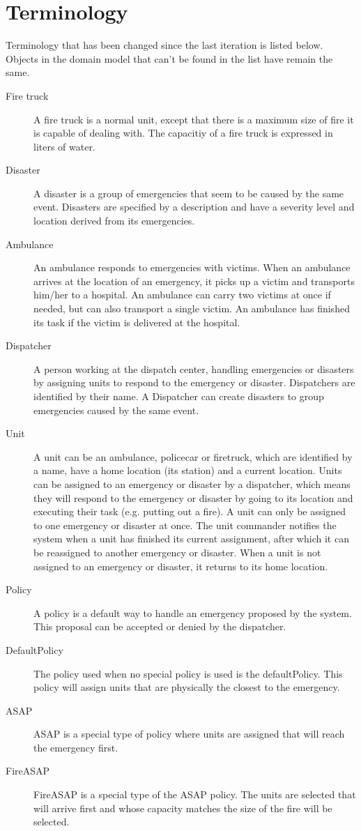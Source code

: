 \section{Terminology}
Terminology that has been changed since the last iteration is listed below. Objects in the domain model that can't be found in the list have remain the same.
\begin{description}
  \item[Fire truck] A fire truck is a normal unit, except that there is a maximum size of fire it is capable of dealing with. The capacitiy of a fire truck is expressed in liters of water.
  \item[Disaster] A disaster is a group of emergencies that seem to be caused by the same event. Disasters are specified by a description and have a severity level and location derived from its emergencies.
  \item[Ambulance] An ambulance responds to emergencies with victims. When an ambulance arrives at the location of an emergency, it picks up a victim and transports him/her to a hospital. An ambulance can carry two victims at once if needed, but can also transport a single victim. An ambulance has finished its task if the victim is delivered at the hospital. 
  \item[Dispatcher] A person working at the dispatch center, handling emergencies or disasters by assigning units to respond to the emergency or disaster. Dispatchers are identified by their name. A Dispatcher can create disasters to group emergencies caused by the same event.
  \item[Unit] A unit can be an ambulance, policecar or firetruck, which are identified by a name, have a home location (its station) and a current location. Units can be assigned to an emergency or disaster by a dispatcher, which means they will respond to the emergency or disaster by going to its location and executing their task (e.g. putting out a fire). A unit can only be assigned to one emergency or disaster at once. The unit commander notifies the system when a unit has finished its current assignment, after which it can be reassigned to another emergency or disaster. When a unit is not assigned to an emergency or disaster, it returns to its home location.
  \item[Policy] A policy is a default way to handle an emergency proposed by the system. This proposal can be accepted or denied by the dispatcher.
  \item[DefaultPolicy] The policy used when no special policy is used is the defaultPolicy. This policy will assign units that are physically the closest to the emergency.
  \item[ASAP] ASAP is a special type of policy where units are assigned that will reach the emergency first.
  \item[FireASAP] FireASAP is a special type of the ASAP policy. The units are selected that will arrive first and whose capacity matches the size of the fire will be selected.
\end{description}
